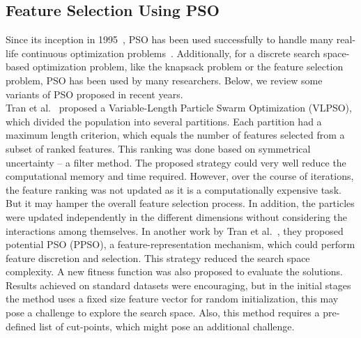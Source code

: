 \documentclass[final,3p,times]{elsarticle}
\begin{document}
\subsection{Feature Selection Using PSO}
Since its inception in 1995~\cite{kennedy1995particle}, PSO has been used successfully to handle many real-life continuous optimization problems~\cite{bi2020energy,yuan2016ttsa}. Additionally, for a discrete search space-based optimization problem, like the knapsack problem or the feature selection problem, PSO has been used by many researchers. {Below, we review some} variants of PSO proposed in recent {years.}\\
Tran et al.~\cite{tran2018variable} proposed a Variable-Length Particle Swarm Optimization (VLPSO), which divided the population into several partitions. Each partition had a maximum length criterion, which {equals} the number of features selected from a subset of ranked features. This ranking was done based on symmetrical uncertainty – a filter method. The proposed strategy could very well reduce the computational memory and time required. However, over the course of iterations, the feature ranking was not updated as it is a computationally expensive task. But it may hamper the overall feature selection process. In addition, the particles were updated independently in the different dimensions without considering the interactions among themselves. In {another} work by Tran et al.~\cite{tran2017new}, they proposed potential PSO (PPSO), a {feature-representation} mechanism, which could perform feature discretion and selection. This strategy reduced the search space complexity. A new fitness function was {also} proposed to evaluate the solutions. {Results} achieved on standard datasets were encouraging, but in the initial stages the method uses a fixed size feature vector for random {initialization,} this may pose a challenge to explore the search space. Also, this method requires a pre-defined list of cut-points, which might pose an additional challenge.\\
\end{document}
